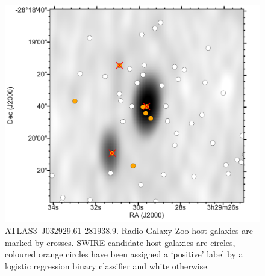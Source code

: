 \documentclass[fleqn,usenatbib,usedcolumn]{mnras}
\begin{document}
    \begin{figure}
      \centering
      \includegraphics[width=\columnwidth]{images/positives.pdf}
      \caption{ATLAS3~J032929.61-281938.9. Radio Galaxy Zoo host galaxies are marked by crosses. SWIRE candidate host galaxies are circles, coloured orange circles have been assigned a `positive' label by a logistic regression binary classifier and white otherwise.
      \label{fig:positives}}
    \end{figure}
\end{document}
